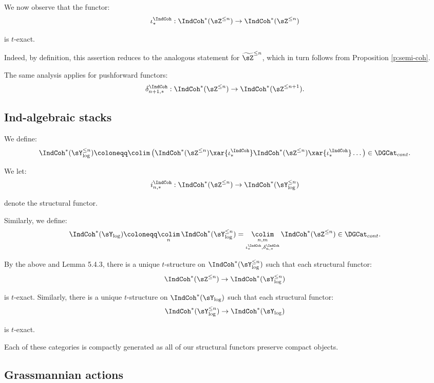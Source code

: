 \subsubsection{}

We now observe that the functor:
%
\[
\iota_*^{\IndCoh}:\IndCoh^*(\sZ^{\leq n}) \to \IndCoh^*(\sZ^{\leq n})
\]

 is $t$-exact.

Indeed, by definition, this assertion reduces to the analogous
statement for $\widetilde{\sZ}^{\leq n}$, which in turn follows
from Proposition \ref{p:semi-coh}.

The same analysis applies for pushforward functors:
%
\[
\delta_{n+1,*}^{\IndCoh}:\IndCoh^*(\sZ^{\leq n}) \to \IndCoh^*(\sZ^{\leq n+1}).
\]

\subsection{Ind-algebraic stacks}

We define:
%
\[
\IndCoh^*(\sY_{\log}^{\leq n}) \coloneqq \colim \, \big(
\IndCoh^*(\sZ^{\leq n}) \xar{\iota_*^{\IndCoh}}
\IndCoh^*(\sZ^{\leq n}) \xar{\iota_*^{\IndCoh}} \ldots \big) \in \DGCat_{cont}.
\]

 We let:
%
\[
i_{n,*}^{\IndCoh}: \IndCoh^*(\sZ^{\leq n}) \to \IndCoh^*(\sY_{\log}^{\leq n})
\]

 denote the structural functor.

Similarly, we define:
%
\[
\IndCoh^*(\sY_{\log}) \coloneqq \underset{n}{\colim} \, \IndCoh^*(\sY_{\log}^{\leq n}) =
\underset{\iota_*^{\IndCoh},\delta_{n,*}^{\IndCoh}}{\underset{n,m}{\colim}} \, \IndCoh^*(\sZ^{\leq n}) \in \DGCat_{cont}.
\]

By the above and \cite{whit} Lemma 5.4.3, there is a unique
$t$-structure on $\IndCoh^*(\sY_{\log}^{\leq n})$ such that
each structural functor:
%
\[
\IndCoh^*(\sZ^{\leq n}) \to \IndCoh^*(\sY_{\log}^{\leq n})
\]

 is $t$-exact. Similarly, there is a unique $t$-structure on
$\IndCoh^*(\sY_{\log})$ such that each structural functor:
%
\[
\IndCoh^*(\sY_{\log}^{\leq n}) \to \IndCoh^*(\sY_{\log})
\]

 is $t$-exact.

Each of these categories is compactly generated as all of our structural
functors preserve compact objects.

\subsection{Grassmannian actions}

